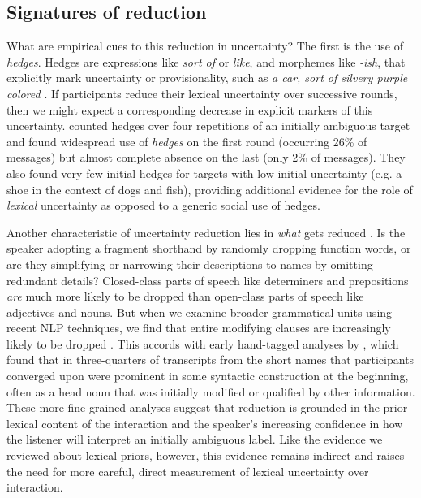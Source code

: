 \subsection{Signatures of reduction}

What are empirical cues to this reduction in uncertainty? The first is the use of \emph{hedges}. Hedges are expressions like \emph{sort of} or \emph{like}, and morphemes like \emph{-ish}, that explicitly mark uncertainty or provisionality, such as \emph{a car, sort of silvery purple colored} \cite{BrennanClark96_ConceptualPactsConversation,Fraser10_Hedging,MedlockBriscoe07_HedgeClassification}. If participants reduce their lexical uncertainty over successive rounds, then we might expect a corresponding decrease in explicit markers of this uncertainty.  counted hedges over four repetitions of an initially ambiguous target and found widespread use of \emph{hedges} on the first round (occurring 26\% of messages) but almost complete absence on the last (only 2\% of messages). They also found very few initial hedges for targets with low initial uncertainty (e.g. a shoe in the context of dogs and fish), providing additional evidence for the role of \emph{lexical} uncertainty as opposed to a generic social use of hedges.

Another characteristic of uncertainty reduction lies in \emph{what} gets reduced \cite{hawkins2020characterizing}.
Is the speaker adopting a fragment shorthand by randomly dropping function words, or are they simplifying or narrowing their descriptions to names by omitting redundant details? Closed-class parts of speech like determiners and prepositions \emph{are} much more likely to be dropped than open-class parts of speech like adjectives and nouns. But when we examine broader grammatical units using recent NLP techniques, we find that entire modifying clauses are increasingly likely to be dropped \cite{HawkinsFrankGoodman17_ConventionFormation}. This accords with early hand-tagged analyses by , which found that in three-quarters of transcripts from  the short names that participants converged upon were prominent in some syntactic construction at the beginning, often as a head noun that was initially modified or qualified by other information. 
These more fine-grained analyses suggest that reduction is grounded in the prior lexical content of the interaction and the speaker's increasing confidence in how the listener will interpret an initially ambiguous label. Like the evidence we reviewed about lexical priors, however, this evidence remains indirect and raises the need for more careful, direct measurement of lexical uncertainty over interaction. 

